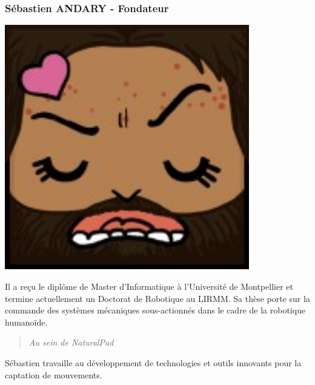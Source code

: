 		\subsubsection*{Sébastien ANDARY - Fondateur}
\begin{minipage}[t!]{0.2\linewidth}
\centering
\includegraphics[width=0.8\textwidth]{images/tetocarre/seb}
\end{minipage}
\begin{minipage}[t!]{0.79\linewidth}
Il a reçu le diplôme de Master d’Informatique à l’Université de Montpellier et termine actuellement un Doctorat de Robotique au LIRMM. Sa thèse porte sur la commande des systèmes mécaniques sous-actionnés dans le cadre de la robotique humanoïde. 
		\begin{quotation} \emph{Au sein de NaturalPad} \end{quotation}
Sébastien travaille au développement de technologies et outils innovants pour la captation de mouvements.
\end{minipage}

